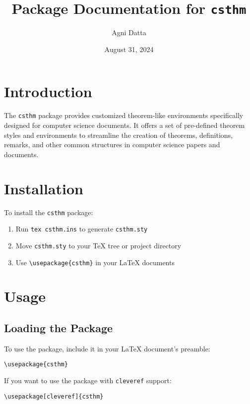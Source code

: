 \documentclass{article}
\title{\bfseries Package Documentation for \texttt{csthm}}
\author{Agni Datta}
\date{August 31, 2024}
\begin{document}
\maketitle
\tableofcontents

\section{Introduction}

The \texttt{csthm} package provides customized theorem-like environments specifically designed for computer science documents. It offers a set of pre-defined theorem styles and environments to streamline the creation of theorems, definitions, remarks, and other common structures in computer science papers and documents.

\section{Installation}

To install the \texttt{csthm} package:

\begin{enumerate}
    \item Run \texttt{tex csthm.ins} to generate \texttt{csthm.sty}
    \item Move \texttt{csthm.sty} to your TeX tree or project directory
    \item Use \verb|\usepackage{csthm}| in your LaTeX documents
\end{enumerate}

\section{Usage}

\subsection{Loading the Package}

To use the package, include it in your LaTeX document's preamble:

\begin{verbatim}
\usepackage{csthm}
\end{verbatim}

If you want to use the package with \texttt{cleveref} support:

\begin{verbatim}
\usepackage[cleveref]{csthm}
\end{verbatim}
\end{document}
